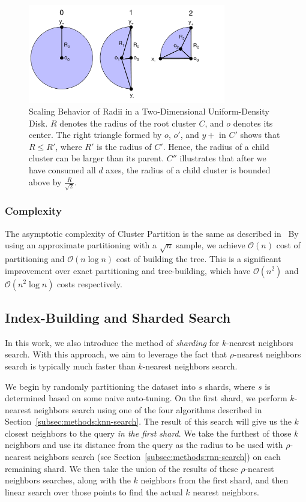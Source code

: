 \begin{figure}[ht!]
    \centering
    \includegraphics[width=3.4in]{images/geometry/geometry.pdf}
    \caption{Scaling Behavior of Radii in a Two-Dimensional Uniform-Density Disk. $R$ 
    denotes the radius of the root cluster $C$, and $o$ denotes its center. The right 
    triangle formed by $o$, $o'$, and $y+$ in $C'$ shows that $R \leq R'$, where $R'$ is the radius of $C'$.
    Hence, the radius of a child cluster can be larger than its parent. $C''$ 
    illustrates that after we have consumed all $d$ axes, the radius of a child cluster
    is bounded above by $\frac{R}{\sqrt{2}}$.}
    \label{fig:methods:scaling_behavior}
\end{figure}

\subsubsection {Complexity}
\label{subsubsec:methods:clustering:complexity}

The asymptotic complexity of Cluster Partition is the same as described in~\cite{ishaq2019clustered}
By using an approximate partitioning with a $\sqrt{n}$ sample, we achieve $\mathcal{O}(n)$ cost of 
partitioning and $\mathcal{O}(n \log n)$ cost of building the tree. This is a significant improvement over 
exact partitioning and tree-building, which have $\mathcal{O}(n^2)$ and $\mathcal{O}(n^2 \log n)$ costs respectively.


\subsection {Index-Building and Sharded Search}
\label{subsec:methods:index-building}
In this work, we also introduce the method of \emph{sharding} for $k$-nearest neighbors search.
With this approach, we aim to leverage the fact that $\rho$-nearest neighbors search is typically 
much faster than $k$-nearest neighbors search. 


We begin by randomly partitioning the dataset into $s$ shards, where $s$ is determined based 
on some naive auto-tuning. On the first shard, we perform 
$k$-nearest neighbors search using one of the four algorithms described in Section~\ref{subsec:methods:knn-search}.
The result of this search will give us the $k$ closest neighbors to the query \emph{in the first shard}. We take the furthest of 
those $k$ neighbors and use its distance from the query as the radius to be used with $\rho$-nearest neighbors search (see Section~\ref{subsec:methods:rnn-search}) 
on each remaining shard. We then take the union of the results of these $\rho$-nearest neighbors searches, along with the $k$ neighbors
from the first shard, and then linear search over those points to find the actual $k$ nearest neighbors.


